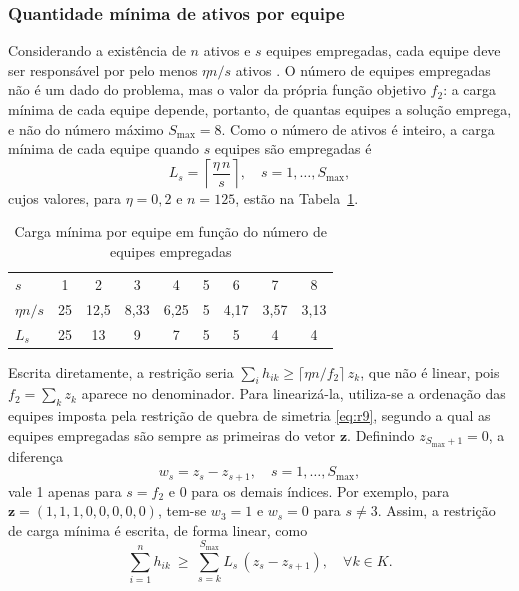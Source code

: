 \documentclass[conference]{IEEEtran}
\begin{document}
\subsubsection{Quantidade mínima de ativos por equipe}
Considerando a existência de $n$ ativos e $s$ equipes empregadas, cada equipe deve ser responsável por pelo menos $\eta n/s$ ativos \cite{batista_tc}. O número de equipes empregadas não é um dado do problema, mas o valor da própria função objetivo $f_2$: a carga mínima de cada equipe depende, portanto, de quantas equipes a solução emprega, e não do número máximo $S_{\max} = 8$. Como o número de ativos é inteiro, a carga mínima de cada equipe quando $s$ equipes são empregadas é
\begin{equation}
L_s = \left\lceil \frac{\eta\, n}{s} \right\rceil, \quad s = 1,\dots,S_{\max},
\label{eq:Lp}
\end{equation}
cujos valores, para $\eta = 0{,}2$ e $n = 125$, estão na Tabela~\ref{tab:Lp}.

\begin{table}[!t]
\renewcommand{\arraystretch}{1.2}
\caption{Carga mínima por equipe em função do número de equipes empregadas}
\label{tab:Lp}
\centering
\begin{tabular}{lcccccccc}
\hline
$s$ & 1 & 2 & 3 & 4 & 5 & 6 & 7 & 8\\
$\eta n/s$ & 25 & 12,5 & 8,33 & 6,25 & 5 & 4,17 & 3,57 & 3,13\\
$L_s$ & 25 & 13 & 9 & 7 & 5 & 5 & 4 & 4\\
\hline
\end{tabular}
\end{table}

Escrita diretamente, a restrição seria $\sum_{i} h_{ik} \ge \lceil \eta n / f_2 \rceil\, z_k$, que não é linear, pois $f_2 = \sum_k z_k$ aparece no denominador. Para linearizá-la, utiliza-se a ordenação das equipes imposta pela restrição de quebra de simetria \eqref{eq:r9}, segundo a qual as equipes empregadas são sempre as primeiras do vetor $\mathbf{z}$. Definindo $z_{S_{\max}+1} = 0$, a diferença
\begin{equation}
w_s = z_s - z_{s+1}, \quad s = 1,\dots,S_{\max},
\end{equation}
vale 1 apenas para $s = f_2$ e 0 para os demais índices. Por exemplo, para $\mathbf{z} = (1,1,1,0,0,0,0,0)$, tem-se $w_3 = 1$ e $w_s = 0$ para $s \neq 3$. Assim, a restrição de carga mínima é escrita, de forma linear, como
\begin{equation}
\sum_{i=1}^{n} h_{ik} \ \ge \ \sum_{s=k}^{S_{\max}} L_s\,(z_s - z_{s+1}), \quad \forall k \in K.
\label{eq:r6}
\end{equation}
\end{document}
